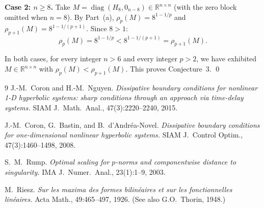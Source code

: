 \documentclass{article}
\begin{document}
\textbf{Case 2: $n \geq 8$.} Take $M = \operatorname{diag}(H_8, 0_{n-8}) \in \mathbb{R}^{n\times n}$ (with the zero block omitted when $n = 8$). By Part~(a), $\rho_p(M) = 8^{1-1/p}$ and $\rho_{p+1}(M) = 8^{1-1/(p+1)}$. Since $8 > 1$:
\[
\rho_p(M) = 8^{1-1/p} < 8^{1-1/(p+1)} = \rho_{p+1}(M).
\]

\medskip

In both cases, for every integer $n > 6$ and every integer $p > 2$, we have exhibited $M \in \mathbb{R}^{n\times n}$ with $\rho_p(M) < \rho_{p+1}(M)$. This proves Conjecture~3. \qed


\begin{thebibliography}{9}
 J.-M.\ Coron and H.-M.\ Nguyen. \textit{Dissipative boundary conditions for nonlinear 1-D hyperbolic systems: sharp conditions through an approach via time-delay systems.} SIAM J.\ Math.\ Anal., 47(3):2220--2240, 2015.

 J.-M.\ Coron, G.\ Bastin, and B.\ d'Andr\'ea-Novel. \textit{Dissipative boundary conditions for one-dimensional nonlinear hyperbolic systems.} SIAM J.\ Control Optim., 47(3):1460--1498, 2008.

 S.\ M.\ Rump. \textit{Optimal scaling for $p$-norms and componentwise distance to singularity.} IMA J.\ Numer.\ Anal., 23(1):1--9, 2003.

 M.\ Riesz. \textit{Sur les maxima des formes bilin\'eaires et sur les fonctionnelles lin\'eaires.} Acta Math., 49:465--497, 1926. (See also G.O.\ Thorin, 1948.)
\end{thebibliography}
\end{document}
